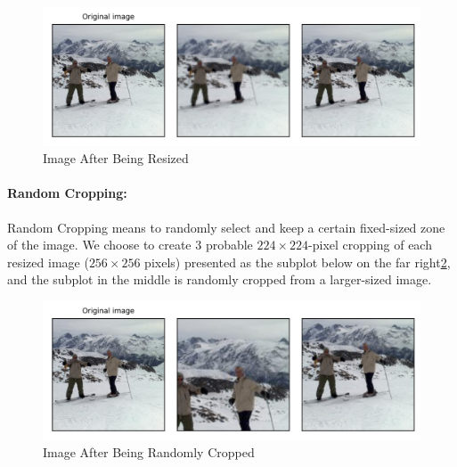\documentclass{article}
\begin{document}
\begin{figure}[htbp]
\centerline{\includegraphics[scale=0.6]{Resize 1.2.png}}
\caption{Image After Being Resized}
\label{fig2}
\end{figure}

\paragraph{Random Cropping:}
Random Cropping means to randomly select and keep a certain fixed-sized zone of the image. We choose to create 3 probable $224\times224$-pixel cropping of each resized image ($256\times256$ pixels) presented as the subplot below on the far right\ref{fig3}, and the subplot in the middle is randomly cropped from a larger-sized image. 
\begin{figure}[H]  %
\centerline{\includegraphics[scale=0.6]{Random Crop 1.1.png}}
\caption{Image After Being Randomly Cropped}
\label{fig3}
\end{figure}
\end{document}
